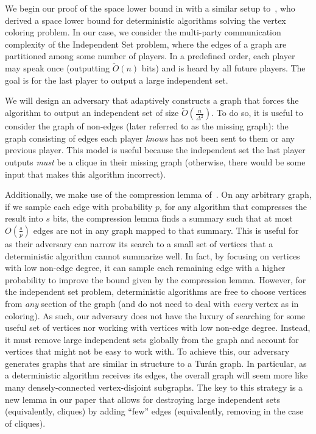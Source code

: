 \documentclass[11pt]{article}
\theoremstyle{definition}
\newcommand{\Ot}{\ensuremath{\widetilde{O}}}
\begin{document}
We begin our proof of the space lower bound in  with a similar setup to~\cite{assadi2022deterministic}, who derived a space lower bound for deterministic algorithms solving the vertex coloring problem. In our case, we consider the multi-party communication complexity of the Independent Set problem, where the edges of a graph are partitioned among some number of players. In a predefined order, each player may speak once (outputting $\Ot(n)$ bits) and is heard by all future players. The goal is for the last player to output a large independent set. 

We will design an adversary that adaptively constructs a graph that forces the algorithm to output an independent set of size $\Ot\left(\frac n{\Delta^2}\right)$. To do so, it is useful to consider the graph of non-edges (later referred to as the missing graph): the graph consisting of edges each player \textit{knows} has not been sent to them or any previous player. This model is useful because the independent set the last player outputs \textit{must} be a clique in their missing graph (otherwise, there would be some input that makes this algorithm incorrect). 

Additionally, we make use of the compression lemma of~\cite{assadi2022deterministic}. On any arbitrary graph, if we sample each edge with probability $p$, for any algorithm that compresses the result into $s$ bits, the compression lemma finds a summary such that at most $O\left(\frac sp\right)$ edges are not in any graph mapped to that summary. This is useful for\ \cite{assadi2022deterministic} as their adversary can narrow its search to a small set of vertices that a deterministic algorithm cannot summarize well. In fact, by focusing on vertices with low non-edge degree, it can sample each remaining edge with a higher probability to improve the bound given by the compression lemma. However, for the independent set problem, deterministic algorithms are free to choose vertices from \textit{any} section of the graph (and do not need to deal with \textit{every} vertex as in coloring). As such, our adversary does not have the luxury of searching for some useful set of vertices nor working with vertices with low non-edge degree. Instead, it must remove large independent sets globally from the graph and account for vertices that might not be easy to work with. To achieve this, our adversary generates graphs that are similar in structure to a Tur\'an graph. In particular, as a deterministic algorithm receives its edges, the overall graph will seem more like many densely-connected vertex-disjoint subgraphs. The key to this strategy is a new lemma in our paper that allows for destroying large independent sets (equivalently, cliques) by adding ``few'' edges (equivalently, removing in the case of cliques).
\end{document}
